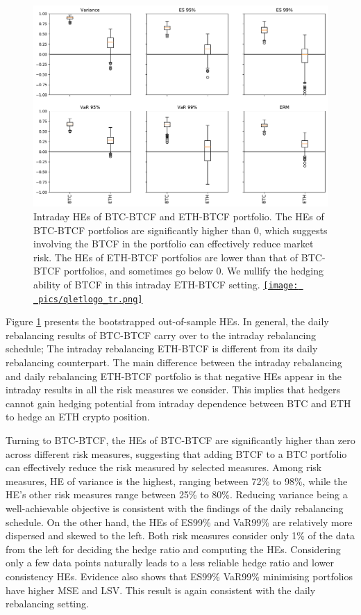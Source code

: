 \documentclass[11pt,a4paper,english]{article}
\begin{document}
\begin{figure}[t]
\includegraphics[width=\textwidth]{_pics/intraday_HE.pdf}
  \caption{Intraday HEs of BTC-BTCF and ETH-BTCF portfolio. The HEs of BTC-BTCF portfolios are significantly higher than $0$,
which suggests involving the BTCF in the portfolio can effectively reduce market risk.
The HEs of ETH-BTCF portfolios are lower than that of BTC-BTCF portfolios, and sometimes go below $0$.
We nullify the hedging ability of BTCF in this intraday ETH-BTCF setting.
  \href{https://github.com/QuantLet/Hedging-Cryptos-with-Bitcoin-Futures/blob/main/newToQuantlet/Pynotebooks/figures/intraday/figure 13.ipynb}{\texttt{[image: \_pics/qletlogo\_tr.png]}} }
\label{fig:HEboxplot_intraday}
\end{figure}

Figure \ref{fig:HEboxplot_intraday} presents the bootstrapped out-of-sample HEs. 
In general, the daily rebalancing results of BTC-BTCF carry over to the intraday rebalancing schedule;
The intraday rebalancing ETH-BTCF is different from its daily rebalancing counterpart.
The main difference between the intraday rebalancing and daily
rebalancing ETH-BTCF portfolio is that negative HEs appear in the
intraday results in all the risk measures we consider. 
This implies that hedgers cannot gain hedging potential from intraday dependence between BTC and ETH to hedge an ETH crypto position. 

Turning to BTC-BTCF, the HEs of BTC-BTCF are
significantly higher than zero across different risk measures,
suggesting that adding BTCF to a BTC portfolio can effectively reduce
the risk measured by selected measures.
Among risk measures, HE of variance is the highest, ranging between 72\% to 98\%, while the
  HE's other risk measures range between 25\% to 80\%.
Reducing variance being a well-achievable objective is
consistent with the findings of the daily rebalancing schedule.
On the other hand, the HEs of ES99\% and VaR99\% are relatively more dispersed and skewed to the left.
Both risk measures consider only 1\% of the data from the left for deciding the hedge ratio and computing the HEs.
Considering only a few data points naturally leads to a less reliable hedge ratio and lower consistency HEs.
Evidence also shows that ES99\% VaR99\% minimising portfolios have higher MSE and LSV.
This result is again consistent with the daily rebalancing setting.
\end{document}
